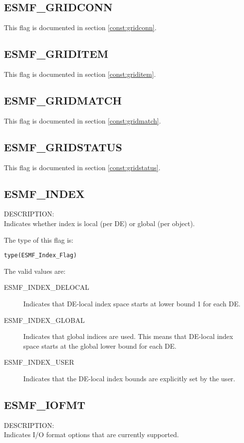 \subsection{ESMF\_GRIDCONN}
This flag is documented in section \ref{const:gridconn}.

\subsection{ESMF\_GRIDITEM}
This flag is documented in section \ref{const:griditem}.

\subsection{ESMF\_GRIDMATCH}
This flag is documented in section \ref{const:gridmatch}.

\subsection{ESMF\_GRIDSTATUS}
This flag is documented in section \ref{const:gridstatus}.

\subsection{ESMF\_INDEX}
\label{const:indexflag}
{\sf DESCRIPTION:\\}
Indicates whether index is local (per DE) or global (per object).

The type of this flag is:

{\tt type(ESMF\_Index\_Flag)}

The valid values are:
\begin{description}
\item [ESMF\_INDEX\_DELOCAL]
      Indicates that DE-local index space starts at lower bound 1 for each DE.
\item [ESMF\_INDEX\_GLOBAL]
      Indicates that global indices are used. This means that DE-local index
      space starts at the global lower bound for each DE.
\item [ESMF\_INDEX\_USER]
      Indicates that the DE-local index bounds are explicitly set by the user.
 \end{description}

\subsection{ESMF\_IOFMT}
\label{opt:iofmtflag}
{\sf DESCRIPTION:\\}
Indicates I/O format options that are currently supported.


